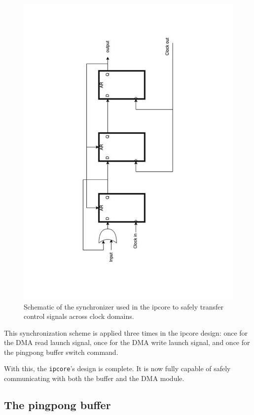 \documentclass[a4paper,11pt,oneside]{report}
\begin{document}
\begin{figure}
    \centering
    \includegraphics[angle=-90, width=\linewidth]{figures/clock_synchronizer.pdf}
    \caption{Schematic of the synchronizer used in the ipcore to safely transfer control signals across clock domains.}
    \label{fig:sync}
\end{figure}

This synchronization scheme is applied three times in the ipcore design: 
once for the DMA read launch signal, once for the DMA write launch signal, and once for the pingpong buffer switch command.

With this, the \texttt{ipcore}'s design is complete. It is now fully capable of safely communicating with both the buffer and the DMA module. 



\subsection{The pingpong buffer}
\end{document}

